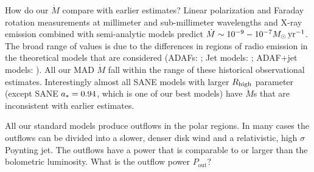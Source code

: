 
How do our $\dot{M}$ compare with earlier estimates?  Linear polarization and Faraday rotation measurements at millimeter and sub-millimeter wavelengths \citep{2000ApJ...538L.121A, 2000ApJ...545..842Q, 2003ApJ...588..331B, 2006ApJ...640..308M, 2006JPhCS..54..354M, 2006ApJ...646L.111M} and X-ray emission \citep{2003ApJ...591..891B, doi:10.1126/science.1240755} combined  with semi-analytic models predict $\dot{M} \sim 10^{-9} - 10^{-7} M_{\odot}\,\mathrm{yr}^{-1}$.  The broad range of values is due to the differences in regions of radio emission in the theoretical models that are considered (ADAFs: \citealt{1998ApJ...492..554N, Yuan_2003}; Jet models: \citealt{1993A&A...278L...1F, 2000A&A...362..113F}; ADAF+jet models: \citealt{2002A&A...383..854Y}).  All our MAD $\dot{M}$ fall within the range of these historical observational estimates. Interestingly almost all SANE models with larger $R_\mathrm{high}$ parameter (except SANE $a_*=0.94$, which is one of our best models) have $\dot{M}$s that are inconsistent with earlier estimates.


All our standard models produce outflows in the polar regions.  In many cases the outflows can be divided into a slower, denser disk wind and a relativistic, high $\sigma$ Poynting jet.  The outflows have a power that is comparable to or larger than the bolometric luminosity.  What is the outflow power $P_\mathrm{out}$?



